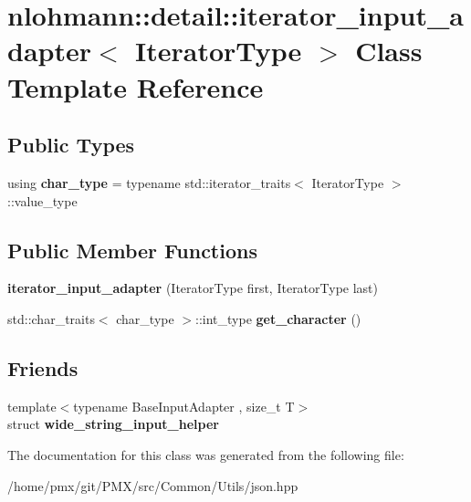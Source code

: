 \hypertarget{classnlohmann_1_1detail_1_1iterator__input__adapter}{}\section{nlohmann\+:\+:detail\+:\+:iterator\+\_\+input\+\_\+adapter$<$ Iterator\+Type $>$ Class Template Reference}
\label{classnlohmann_1_1detail_1_1iterator__input__adapter}
\subsection*{Public Types}
\begin{DoxyCompactItemize}
\item 
\mbox{\label{classnlohmann_1_1detail_1_1iterator__input__adapter_a7cc60e68767005322ab4b692c9dff283}} 
using {\bfseries char\+\_\+type} = typename std\+::iterator\+\_\+traits$<$ Iterator\+Type $>$\+::value\+\_\+type
\end{DoxyCompactItemize}
\subsection*{Public Member Functions}
\begin{DoxyCompactItemize}
\item 
\mbox{\label{classnlohmann_1_1detail_1_1iterator__input__adapter_a9423d7166b9e3092f149266acd064ba7}} 
{\bfseries iterator\+\_\+input\+\_\+adapter} (Iterator\+Type first, Iterator\+Type last)
\item 
\mbox{\label{classnlohmann_1_1detail_1_1iterator__input__adapter_a01706f07681df083c2174d236ff3d643}} 
std\+::char\+\_\+traits$<$ char\+\_\+type $>$\+::int\+\_\+type {\bfseries get\+\_\+character} ()
\end{DoxyCompactItemize}
\subsection*{Friends}
\begin{DoxyCompactItemize}
\item 
\mbox{\label{classnlohmann_1_1detail_1_1iterator__input__adapter_ab86106ba230f1542b94dcd96e6ab3221}} 
{\footnotesize template$<$typename Base\+Input\+Adapter , size\+\_\+t T$>$ }\\struct {\bfseries wide\+\_\+string\+\_\+input\+\_\+helper}
\end{DoxyCompactItemize}


The documentation for this class was generated from the following file\+:\begin{DoxyCompactItemize}
\item 
/home/pmx/git/\+P\+M\+X/src/\+Common/\+Utils/json.\+hpp\end{DoxyCompactItemize}
